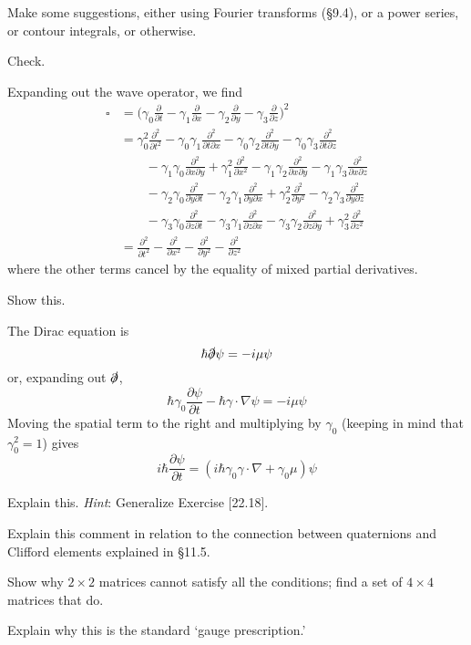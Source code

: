 \documentclass[../road-to-reality.tex]{subfiles}
\begin{document}
\begin{questions}
	\question Make some suggestions, either using Fourier transforms (\S9.4), or a power series, or contour integrals, or otherwise.
	
	\question Check.
	
	\begin{solution}
		Expanding out the wave operator, we find
		\begin{align*}
			\square &= \Big(\gamma_0\frac{\partial}{\partial t} - \gamma_1\frac{\partial}{\partial x} - \gamma_2\frac{\partial}{\partial y} - \gamma_3\frac{\partial}{\partial z}\Big)^2 \\
			&= \gamma_0^2\frac{\partial^2}{\partial t^2} - \gamma_0\gamma_1\frac{\partial^2}{\partial t\partial x} - \gamma_0\gamma_2\frac{\partial^2}{\partial t\partial y} - \gamma_0\gamma_3\frac{\partial^2}{\partial t\partial z} \\
			&\qquad-\gamma_1\gamma_0\frac{\partial^2}{\partial x\partial y} + \gamma_1^2\frac{\partial^2}{\partial x^2} - \gamma_1\gamma_2\frac{\partial^2}{\partial x\partial y} - \gamma_1\gamma_3\frac{\partial^2}{\partial x\partial z} \\
			&\qquad - \gamma_2\gamma_0\frac{\partial^2}{\partial y\partial t} - \gamma_2\gamma_1\frac{\partial^2}{\partial y\partial x} + \gamma_2^2\frac{\partial^2}{\partial y^2} - \gamma_2\gamma_3\frac{\partial^2}{\partial y\partial z} \\
			&\qquad - \gamma_3\gamma_0\frac{\partial^2}{\partial z\partial t} - \gamma_3\gamma_1\frac{\partial^2}{\partial z\partial x} - \gamma_3\gamma_2\frac{\partial^2}{\partial z\partial y} + \gamma_3^2 \frac{\partial^2}{\partial z^2} \\
			&= \frac{\partial^2}{\partial t^2} - \frac{\partial^2}{\partial x^2} - \frac{\partial^2}{\partial y^2} - \frac{\partial^2}{\partial z^2}
		\end{align*}
		where the other terms cancel by the equality of mixed partial derivatives.
	\end{solution}

	\question Show this.
	
	\begin{solution}
		The Dirac equation is
		\[
			\hbar\slashed\partial\psi = -i\mu\psi
		\]
		or, expanding out $\slashed\partial$,
		\[
			\hbar\gamma_0\frac{\partial\psi}{\partial t} - \hbar\gamma\cdot\nabla\psi = -i\mu\psi
		\]
		Moving the spatial term to the right and multiplying by $\gamma_0$ (keeping in mind that $\gamma_0^2 = 1$) gives
		\[
			i\hbar\frac{\partial\psi}{\partial t} = (i\hbar\gamma_0\gamma\cdot\nabla + \gamma_0\mu)\psi
		\]
	\end{solution}

	\question Explain this. \textit{Hint}: Generalize Exercise [22.18].
	
	\question Explain this comment in relation to the connection between quaternions and Clifford elements explained in \S11.5.
	
	\question Show why $2\times2$ matrices cannot satisfy all the conditions; find a set of $4\times4$ matrices that do.

	\question Explain why this is the standard `gauge prescription.'
	
	\end{questions}
\end{document}
